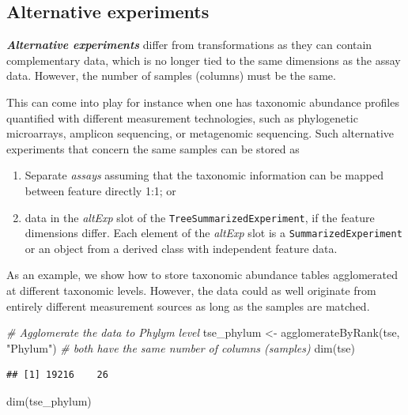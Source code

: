 \documentclass[
]{book}
\newenvironment{Shaded}{\begin{snugshade}}{\end{snugshade}}
\newcommand{\CommentTok}[1]{\textcolor[rgb]{0.56,0.35,0.01}{\textit{#1}}}
\newcommand{\FunctionTok}[1]{\textcolor[rgb]{0.00,0.00,0.00}{#1}}
\newcommand{\NormalTok}[1]{#1}
\newcommand{\OtherTok}[1]{\textcolor[rgb]{0.56,0.35,0.01}{#1}}
\newcommand{\StringTok}[1]{\textcolor[rgb]{0.31,0.60,0.02}{#1}}
\providecommand{\tightlist}{%
  \setlength{\itemsep}{0pt}\setlength{\parskip}{0pt}}
\begin{document}
\hypertarget{alternative-experiments}{%
\subsection{Alternative experiments}\label{alternative-experiments}}

\emph{\textbf{Alternative experiments}} differ from transformations as they can
contain complementary data, which is no longer tied to the same
dimensions as the assay data. However, the number of samples (columns)
must be the same.

This can come into play for instance when one has taxonomic abundance
profiles quantified with different measurement technologies, such as
phylogenetic microarrays, amplicon sequencing, or metagenomic
sequencing. Such alternative experiments that concern the same samples
can be stored as

\begin{enumerate}
\def\labelenumi{\arabic{enumi}.}
\tightlist
\item
  Separate \emph{assays} assuming that the taxonomic information can be mapped
  between feature directly 1:1; or
\item
  data in the \emph{altExp} slot of the \texttt{TreeSummarizedExperiment}, if the feature
  dimensions differ. Each element of the \emph{altExp} slot is a \texttt{SummarizedExperiment}
  or an object from a derived class with independent feature data.
\end{enumerate}

As an example, we show how to store taxonomic abundance tables
agglomerated at different taxonomic levels. However, the data could as
well originate from entirely different measurement sources as long as
the samples are matched.

\begin{Shaded}
\begin{Highlighting}[]
\CommentTok{\# Agglomerate the data to Phylym level}
\NormalTok{tse\_phylum }\OtherTok{\textless{}{-}} \FunctionTok{agglomerateByRank}\NormalTok{(tse, }\StringTok{"Phylum"}\NormalTok{)}
\CommentTok{\# both have the same number of columns (samples)}
\FunctionTok{dim}\NormalTok{(tse)}
\end{Highlighting}
\end{Shaded}

\begin{verbatim}
## [1] 19216    26
\end{verbatim}

\begin{Shaded}
\begin{Highlighting}[]
\FunctionTok{dim}\NormalTok{(tse\_phylum)}
\end{Highlighting}
\end{Shaded}
\end{document}
